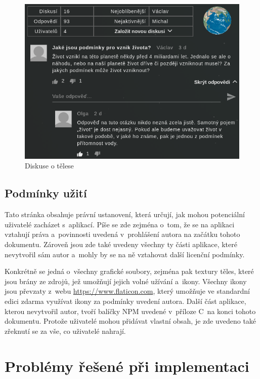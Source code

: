\documentclass[a4paper,12pt]{article}
\begin{document}
\begin{figure}[H]
\begin{center}
\includegraphics[width=350pt]{Images/Discussion.png}
\caption{Diskuse o tělese}
\end{center}
\end{figure}

\vspace*{-1cm}
\subsection{Podmínky užití}

Tato stránka obsahuje právní ustanovení, která určují, jak mohou potenciální uživatelé zacházet s~aplikací. Píše se zde zejména o~tom, že se na aplikaci vztahují práva a~povinnosti uvedená v~prohlášení autora na začátku tohoto dokumentu. Zároveň jsou zde také uvedeny všechny ty části aplikace, které nevytvořil sám autor a~mohly by se na ně vztahovat další licenční podmínky.

Konkrétně se jedná o~všechny grafické soubory, zejména pak textury těles, které jsou brány ze zdrojů, jež umožňují jejich volné užívání a~ikony. Všechny ikony jsou převzaty z~webu \url{https://www.flaticon.com}, který umožňuje ve standardní edici zdarma využívat ikony za podmínky uvedení autora. Další část aplikace, kterou nevytvořil autor, tvoří balíčky NPM uvedené v~příloze C~na konci tohoto dokumentu. Protože uživatelé mohou přidávat vlastní obsah, je zde uvedeno také zřeknutí se za vše, co uživatelé nahrají.

\section{Problémy řešené při implementaci}
\end{document}
